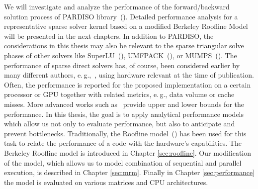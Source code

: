We will investigate and analyze the performance of the forward/backward solution process of PARDISO library~(\cite{schenk-2004,schenk-2006,Bollhofer2020}). {\color{blue} Detailed performance analysis for a representative sparse solver kernel based on a modified Berkeley Roofline Model will be presented in the next chapters}.
In addition to PARDISO, the considerations in this thesis may also be relevant to the sparse triangular solve phases of other solvers like SuperLU~(\cite{li-2005}), UMFPACK~(\cite{davis-1997}), or MUMPS~(\cite{amestoy-2000,amestoy-2001,amestoy-2006}). The performance of sparse direct solvers has, of course, been considered earlier
by many different authors, e.\,g.,~\cite{heath-1999,sherry-2008,marrakchi-2017,park-2014,weifeng-2016},
using hardware relevant at the time of publication. Often, the performance is reported for the proposed implementation on a certain processor or GPU together with related metrics, e.\,g., data volume or cache misses. More advanced works such as~\cite{vuduc-2002} provide upper and lower bounds for the performance. {\color{blue} In this thesis, the goal is to apply analytical performance models which allow us not only to evaluate performance, but also to anticipate and prevent bottlenecks. Traditionally}, the Roofline
model~(\cite{callahan88,hockney89,schoenauer00,williams-2009}) {\color{blue}has been} used
for this task to relate the performance of a code with the hardware's capabilities.
{\color{blue} The Berkeley Roofline model is introduced in Chapter \ref{sec:roofline}. Our modification of the model, which allows us to model combination of sequential and parallel execution, is described in Chapter \ref{sec:mrm}. Finally in Chapter \ref{sec:performance} the model is evaluated on various matrices and CPU architectures.}

